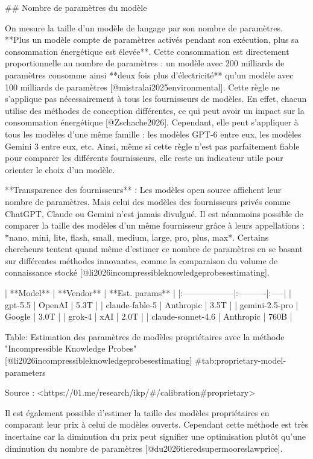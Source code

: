 ## Nombre de paramètres du modèle

On mesure la taille d'un modèle de langage par son nombre de paramètres. **Plus un modèle compte de paramètres activés pendant son exécution, plus sa consommation énergétique est élevée**. Cette consommation est directement proportionnelle au nombre de paramètres : un modèle avec 200 milliards de paramètres consomme ainsi **deux fois plus d'électricité** qu'un modèle avec 100 milliards de paramètres [@mistralai2025environmental].
Cette règle ne s'applique pas nécessairement à tous les fournisseurs de modèles. En effet, chacun utilise des méthodes de conception différentes, ce qui peut avoir un impact sur la consommation énergétique [@Zschache2026]. Cependant, elle peut s'appliquer à tous les modèles d'une même famille : les modèles GPT-6 entre eux, les modèles Gemini 3 entre eux, etc.
Ainsi, même si cette règle n'est pas parfaitement fiable pour comparer les différents fournisseurs, elle reste un indicateur utile pour orienter le choix d'un modèle.

**Transparence des fournisseurs** :
Les modèles open source affichent leur nombre de paramètres. Mais celui des modèles des fournisseurs privés comme ChatGPT, Claude ou Gemini n'est jamais divulgué. Il est néanmoins possible de comparer la taille des modèles d'un même fournisseur grâce à leurs appellations : *nano, mini, lite, flash, small, medium, large, pro, plus, max*.
Certains chercheurs tentent quand même d'estimer ce nombre de paramètres en se basant sur différentes méthodes innovantes, comme la comparaison du volume de connaissance stocké [@li2026incompressibleknowledgeprobesestimating].

| **Model** | **Vendor** | **Est. params** |
|:------------------|:----------|:-----|
| gpt-5.5           | OpenAI    | 5.3T |
| claude-fable-5    | Anthropic | 3.5T |
| gemini-2.5-pro    | Google    | 3.0T |
| grok-4            | xAI       | 2.0T |
| claude-sonnet-4.6 | Anthropic | 760B |

Table: Estimation des paramètres de modèles propriétaires avec la méthode "Incompressible Knowledge Probes" [@li2026incompressibleknowledgeprobesestimating] {#tab:proprietary-model-parameters}

Source : <https://01.me/research/ikp/#/calibration#proprietary>

Il est également possible d'estimer la taille des modèles propriétaires en comparant leur prix à celui de modèles ouverts. Cependant cette méthode est très incertaine car la diminution du prix peut signifier une optimisation plutôt qu'une diminution du nombre de paramètres [@du2026tieredsupermooreslawprice].


